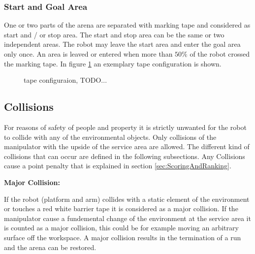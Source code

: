 \subsubsection{Start and Goal Area}
\label{subsubsec: Start and Goal Area}


One or two parts of the arena are separated with marking tape and considered as start and / or stop area. The start and stop area can be the same or two independent areas. The robot may leave the start area and enter the goal area only once. An area is leaved or entered when more than $50\%$ of the robot crossed the marking tape. In figure \ref{fig:tapeconfig} an exemplary tape configuration is shown.

\begin{figure} [h!]
	\begin{center}
		\missingfigure[figwidth=6cm]{}	
	\end{center}
	\caption{tape configuraion, TODO...}
	\label{fig:tapeconfig}
\end{figure}


\subsection{Collisions}
\label{subsec: Collisions}


For reasons of safety of people and property it is strictly unwanted for the robot to collide
with any of the environmental objects. Only collisions of the manipulator with the upside of
the service area are allowed. The different kind of collisions that can occur are defined in the
following subsections. Any Collisions cause a point penalty that is explained in section \ref{sec:ScoringAndRanking}. 

\textbf{Major Collision:}

If the robot (platform and arm) collides with a static element of the environment or touches a red white barrier tape it is considered as a major collision. If the manipulator cause a fundemental change of the environment at the service area it is counted as a major collision, this could be for example moving an arbitrary surface off the workspace. A major collision results in the termination of a run and the arena can be restored. 

